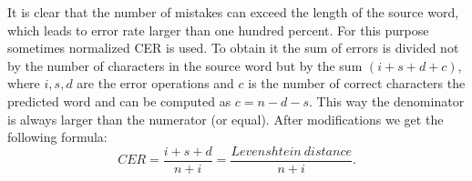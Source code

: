 It is clear that the number of mistakes can exceed the length of the source word, which leads to error rate larger than one hundred percent. For this purpose sometimes normalized CER is used. To obtain it the sum of errors is divided not by the number of characters in the source word but by the sum $(i+s+d+c)$, where $i,s,d$ are the error operations and $c$ is the number of correct characters the predicted word and can be computed as $c = n - d - s$. This way the denominator is always larger than the numerator (or equal). After modifications we get the following formula:
\begin{equation}
    CER = \frac{i+s+d}{n+i}=\frac{Levenshtein\ distance}{n+i}.
\end{equation}
